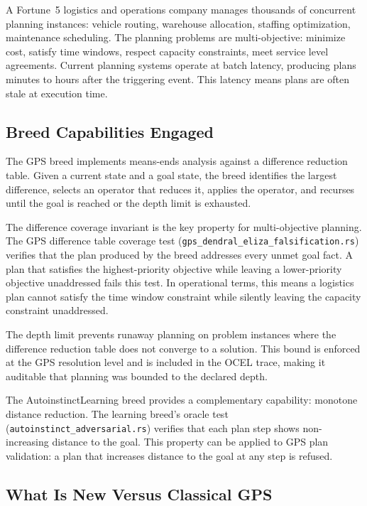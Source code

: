 A Fortune~5 logistics and operations company manages thousands of concurrent
planning instances: vehicle routing, warehouse allocation, staffing optimization,
maintenance scheduling. The planning problems are multi-objective: minimize cost,
satisfy time windows, respect capacity constraints, meet service level agreements.
Current planning systems operate at batch latency, producing plans minutes to
hours after the triggering event. This latency means plans are often stale at
execution time.

\subsection*{Breed Capabilities Engaged}

The GPS breed implements means-ends analysis against a difference reduction table.
Given a current state and a goal state, the breed identifies the largest difference,
selects an operator that reduces it, applies the operator, and recurses until the
goal is reached or the depth limit is exhausted.

The difference coverage invariant is the key property for multi-objective planning.
The GPS difference table coverage test (\texttt{gps\_dendral\_eliza\_falsification.rs})
verifies that the plan produced by the breed addresses every unmet goal fact. A
plan that satisfies the highest-priority objective while leaving a lower-priority
objective unaddressed fails this test. In operational terms, this means a logistics
plan cannot satisfy the time window constraint while silently leaving the capacity
constraint unaddressed.

The depth limit prevents runaway planning on problem instances where the difference
reduction table does not converge to a solution. This bound is enforced at the
GPS resolution level and is included in the OCEL trace, making it auditable that
planning was bounded to the declared depth.

The AutoinstinctLearning breed provides a complementary capability: monotone
distance reduction. The learning breed's oracle test (\texttt{autoinstinct\_adversarial.rs})
verifies that each plan step shows non-increasing distance to the goal. This
property can be applied to GPS plan validation: a plan that increases distance
to the goal at any step is refused.

\subsection*{What Is New Versus Classical GPS}

